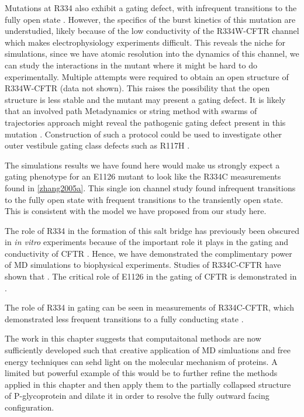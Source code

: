 Mutations at R334 also exhibit a gating defect, with infrequent transitions to the fully open state \cite{zhang2005a ,cui2013a, sheppard1993}. However, the specifics of the burst kinetics of this mutation are understudied, likely because of the low conductivity of the R334W-CFTR channel which makes electrophysiology experiments difficult. This reveals the niche for simulations, since we have atomic resolution into the dynamics of this channel, we can study the interactions in the mutant where it might be hard to do experimentally. Multiple attempts were required to obtain an open structure of R334W-CFTR (data not shown). This raises the possibility that the open structure is less stable and the mutant may present a gating defect. It is likely that an involved path Metadynamics or string method with swarms of trajectories approach might reveal the pathogenic gating defect present in this mutation \cite{lev2020, hoffmann2018, branduardi2007}. Construction of such a protocol could be used to investigate other outer vestibule gating class defects such as R117H \cite{simon2021}.


The simulations results we have found here would make us strongly expect a gating phenotype for an E1126 mutant to look like the R334C measurements found in \ref{zhang2005a}. This single ion channel study found infrequent transitions to the fully open state with frequent transitions to the transiently open state. This is consistent with the model we have proposed from our study here.

The role of R334 in the formation of this salt bridge has previously been obscured in \textit{in vitro} experiments because of the important role it plays in the gating and conductivity of CFTR \cite{gong2003}. Hence, we have demonstrated the complimentary power of MD simulations to biophysical experiments. Studies of R334C-CFTR have shown that \cite{zhang2005, rahman2013}. The critical role of E1126 in the gating of CFTR is demonstrated in \cite{cui2014}.

The role of R334 in gating can be seen in measurements of R334C-CFTR, which demonstrated less frequent transitions to a fully conducting state \cite{zhang2005a}.

The work in this chapter suggests that computaitonal methods are now sufficiently developed such that creative application of MD simluations and free energy techniques can sehd light on the molecular mechanism of proteins. A limited but powerful example of this would be to further refine the methods applied in this chapter and then apply them to the partially collapsed structure of P-glycoprotein and dilate it in order to resolve the fully outward facing configuration.

